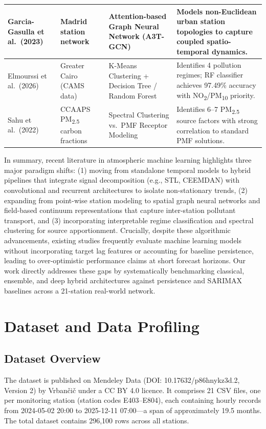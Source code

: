 \documentclass[runningheads]{llncs}
\begin{document}
\begin{small}
\begin{longtable}{p{2.4cm} p{2.0cm} p{3.5cm} p{3.4cm}}
\hline
Garcia-Gasulla et al.\ (2023) \cite{ref_stgnn_madrid} & Madrid station network & Attention-based Graph Neural Network (A3T-GCN) & Models non-Euclidean urban station topologies to capture coupled spatio-temporal dynamics. \\
\hline
Elmourssi et al.\ (2026) \cite{ref_cairo_cluster} & Greater Cairo (CAMS data) & K-Means Clustering + Decision Tree / Random Forest & Identifies 4 pollution regimes; RF classifier achieves 97.49\% accuracy with NO\textsubscript{2}/PM\textsubscript{10} priority. \\
\hline
Sahu et al.\ (2022) \cite{ref_spectral_sa} & CCAAPS PM\textsubscript{2.5} carbon fractions & Spectral Clustering vs.\ PMF Receptor Modeling & Identifies 6--7 PM\textsubscript{2.5} source factors with strong correlation to standard PMF solutions. \\
\end{longtable}
\end{small}

In summary, recent literature in atmospheric machine learning highlights three major paradigm shifts: (1) moving from standalone temporal models to hybrid pipelines that integrate signal decomposition (e.g., STL, CEEMDAN) with convolutional and recurrent architectures to isolate non-stationary trends, (2) expanding from point-wise station modeling to spatial graph neural networks and field-based continuum representations that capture inter-station pollutant transport, and (3) incorporating interpretable regime classification and spectral clustering for source apportionment. Crucially, despite these algorithmic advancements, existing studies frequently evaluate machine learning models without incorporating target lag features or accounting for baseline persistence, leading to over-optimistic performance claims at short forecast horizons. Our work directly addresses these gaps by systematically benchmarking classical, ensemble, and deep hybrid architectures against persistence and SARIMAX baselines across a 21-station real-world network.

\section{Dataset and Data Profiling}

\subsection{Dataset Overview}
The dataset is published on Mendeley Data (DOI: 10.17632/p86hnykz3d.2,
Version 2) by Vrban{\v{c}}i{\v{c}} \cite{ref_dataset} under a CC BY 4.0
licence. It comprises 21 CSV files, one per monitoring station
(station codes E403–E804), each containing hourly records from
2024-05-02 20:00 to 2025-12-11 07:00—a span of approximately 19.5 months.
The total dataset contains 296{,}100 rows across all stations.
\end{document}
